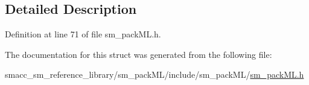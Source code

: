 \subsection{Detailed Description}


Definition at line 71 of file sm\+\_\+pack\+M\+L.\+h.



The documentation for this struct was generated from the following file\+:\begin{DoxyCompactItemize}
\item 
smacc\+\_\+sm\+\_\+reference\+\_\+library/sm\+\_\+pack\+M\+L/include/sm\+\_\+pack\+M\+L/\hyperlink{sm__packML_8h}{sm\+\_\+pack\+M\+L.\+h}\end{DoxyCompactItemize}
